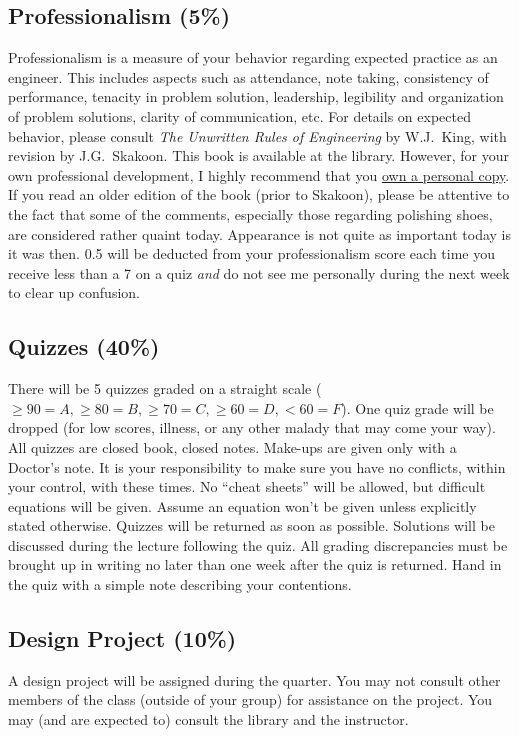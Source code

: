 \documentclass[10pt]{article}
\begin{document}
\subsection*{Professionalism (5\%)}
Professionalism is a measure of your behavior regarding expected practice as an engineer. This includes aspects such as attendance, note taking, consistency of performance, tenacity in problem solution, leadership, legibility and organization of problem solutions, clarity of communication, etc. For details on expected behavior, please consult \emph{The Unwritten Rules of Engineering} by W.J.~King, with revision by  J.G.~Skakoon. This book is available at the library. However, for your own professional development, I highly recommend that you \href{http://members.asme.org/catalog/ItemView.cfm?ItemNumber=801624}{own a personal copy}. If you read an older edition of the book (prior to Skakoon), please be attentive to the fact that some of the comments, especially those regarding polishing shoes, are considered rather quaint today. Appearance is not quite as important today is it was then. 0.5 will be deducted from your professionalism score each time you receive less than a 7 on a quiz \emph{and} do not see me personally during the next week to clear up confusion. 


\subsection*{Quizzes (40\%)}
There will be 5 quizzes graded on a straight scale ($\geq 90 = A,\geq 80 = B, \geq 70 = C, \geq 60 = D, < 60 = F$).  %
One quiz grade will be dropped (for low scores, illness, or any other malady that may come your way).  All quizzes are closed book, closed notes.  Make-ups are given only with a Doctor's note.  It is your responsibility to make sure you have no conflicts, within your control, with these times.  No ``cheat sheets'' will be allowed, but difficult equations will be given.  Assume an equation won't be given unless explicitly stated otherwise. Quizzes will be returned as soon as possible.  Solutions will be discussed during the lecture following the quiz.  All grading discrepancies must be brought up in writing no later than one week after the quiz is returned.  Hand in the quiz with a simple note describing your contentions.

\subsection*{Design Project (10\%)}
A design project will be assigned during the quarter. You may not consult other members of the class (outside of your group) for assistance on the project. You may (and are expected to) consult the library and the instructor.
\end{document}
